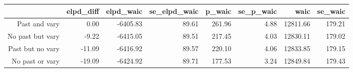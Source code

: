 \begin{table}[ht]
\centering
\begin{tabular}{rrrrrrrr}
  \hline
 & elpd\_diff & elpd\_waic & se\_elpd\_waic & p\_waic & se\_p\_waic & waic & se\_waic \\ 
  \hline
Past and vary & 0.00 & -6405.83 & 89.61 & 261.96 & 4.88 & 12811.66 & 179.21 \\ 
  No past but vary & -9.22 & -6415.05 & 89.51 & 217.45 & 4.03 & 12830.11 & 179.02 \\ 
  Past but no vary & -11.09 & -6416.92 & 89.57 & 220.10 & 4.06 & 12833.85 & 179.15 \\ 
  No past or vary & -19.09 & -6424.92 & 89.71 & 177.53 & 3.24 & 12849.84 & 179.43 \\ 
   \hline
\end{tabular}
\end{table}
